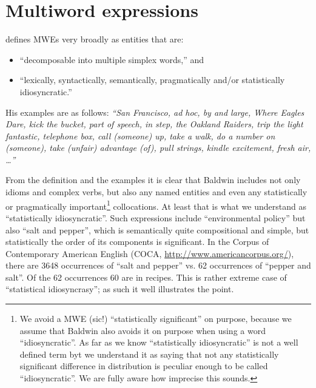 
\chapter{Multiword expressions}
%
%
%
%

\citet{baldwin:2004} defines MWEs very broadly as entities that are:
\begin{itemize}
\item
``decomposable into multiple simplex words,'' and
\item
``lexically, syntactically, semantically, pragmatically and/or statistically idiosyncratic.''
\end{itemize}

His examples are as follows: \emph{``San Francisco, ad hoc, by and large, Where Eagles Dare, kick the bucket, part of speech, in step, the Oakland Raiders, trip the light fantastic, telephone box, call (someone) up, take a walk, do a number on (someone), take (unfair) advantage (of), pull strings, kindle excitement, fresh air, \ldots''}

From the definition and the examples it is clear that Baldwin includes not only idioms and complex verbs, but also any named entities and even any statistically or pragmatically important\footnote{We avoid a MWE (sic!) ``statistically significant'' on purpose, because we assume that Baldwin also avoids it on purpose when using a word ``idiosyncratic''. As far as we know ``statistically idiosyncratic'' is not a well defined term byt we understand it as saying that not any statistically significant difference in distribution is peculiar enough to be called ``idiosyncratic''. We are fully aware how imprecise this sounds.} collocations. At least that is what we understand as ``statistically idiosyncratic''. Such expressions include ``environmental policy'' but also ``salt and pepper'', which is semantically quite compositional and simple, but statistically the order of its components is significant. In the Corpus of Contemporary American English (COCA, \url{http://www.americancorpus.org/}), there are 3648 occurrences of ``salt and pepper'' vs. 62 occurrences of ``pepper and salt''. Of the 62 occurrences 60 are in recipes. This is rather extreme case of ``statistical idiosyncrasy''; as such it well illustrates the point.

